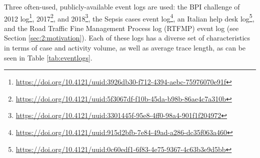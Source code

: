 Three often-used, publicly-available event logs are used: the BPI challenge of 2012 log\footnote{\url{https://doi.org/10.4121/uuid:3926db30-f712-4394-aebc-75976070e91f}}, 2017\footnote{\url{https://doi.org/10.4121/uuid:5f3067df-f10b-45da-b98b-86ae4c7a310b}}, and 2018\footnote{\url{https://doi.org/10.4121/uuid:3301445f-95e8-4ff0-98a4-901f1f204972}}, the Sepsis cases event log\footnote{\url{https://doi.org/10.4121/uuid:915d2bfb-7e84-49ad-a286-dc35f063a460}}, an Italian help desk log\footnote{\url{https://doi.org/10.4121/uuid:0c60edf1-6f83-4e75-9367-4c63b3e9d5bb}}, and the Road Traffic Fine Management Process log (RTFMP) event log (see Section \ref{sec:2:motivation}).
Each of these logs has a diverse set of characteristics in terms of case and activity volume, as well as average trace length, as can be seen in Table \ref{tab:eventlogs}.
\begin{table}[htbp]
  \centering
  \caption{Overview of the characteristics of the event logs used in the experimental evaluation.}
  \label{tab:eventlogs}%
\end{table}%

